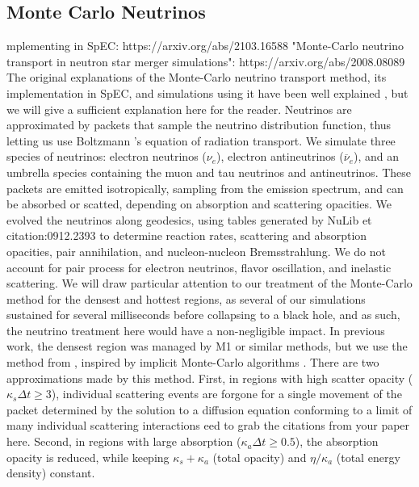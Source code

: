 \documentclass[%
twocolumn,
superscriptaddress,
nofootinbib,
 amsmath,amssymb,
 aps, prd
]{revtex4-2}
\newcommand{\alex}[1]{\color{red}{#1}}
\begin{document}
  \subsection{Monte Carlo Neutrinos}
  \label{sec:methods_MC}
  {\alex
      Implementing in SpEC: https://arxiv.org/abs/2103.16588
      "Monte-Carlo neutrino transport in neutron star merger simulations": https://arxiv.org/abs/2008.08089
  }
      The original explanations of the Monte-Carlo neutrino transport method, its implementation in SpEC, and simulations using it have been well explained \cite{Foucart_201806,Foucart_201801,Foucart_2020,Foucart_2021,Foucart_2023}, but we will give a sufficient explanation here for the reader.
      Neutrinos are approximated by packets that sample the neutrino distribution function, thus letting us use Boltzmann 's equation of radiation transport.
      We simulate three species of neutrinos: electron neutrinos ($\nu_e$), electron antineutrinos ($\overline{\nu}_e$), and an umbrella species containing the muon and tau neutrinos and antineutrinos.
      These packets are emitted isotropically, sampling from the emission spectrum, and can be absorbed or scatted, depending on absorption and scattering opacities.
      We evolved the neutrinos along geodesics, using tables generated by NuLib {\alex Get citation:0912.2393} to determine reaction rates, scattering and absorption opacities, pair annihilation, and nucleon-nucleon Bremsstrahlung. 
      We do not account for pair process for electron neutrinos, flavor oscillation, and inelastic scattering.
      We will draw particular attention to our treatment of the Monte-Carlo method for the densest and hottest regions, as several of our simulations sustained for several milliseconds before collapsing to a black hole, and as such, the neutrino treatment here would have a non-negligible impact.
      In previous work, the densest region was managed by M1 or similar methods, but we use the method from \cite{Foucart_2023}, inspired by implicit Monte-Carlo algorithms \cite{Fleck_1971}.
      There are two approximations made by this method.
      First, in regions with high scatter opacity ($\kappa_s\Delta t \geq 3$), individual scattering events are forgone for a single movement of the packet determined by the solution to a diffusion equation conforming to a limit of many individual scattering interactions {\alex Need to grab the citations from your paper here}.
      Second, in regions with large absorption ($\kappa_a\Delta t \geq 0.5$), the absorption opacity is reduced, while keeping $\kappa_s+\kappa_a$ (total opacity) and $\eta/\kappa_a$ (total energy density) constant.
\end{document}
